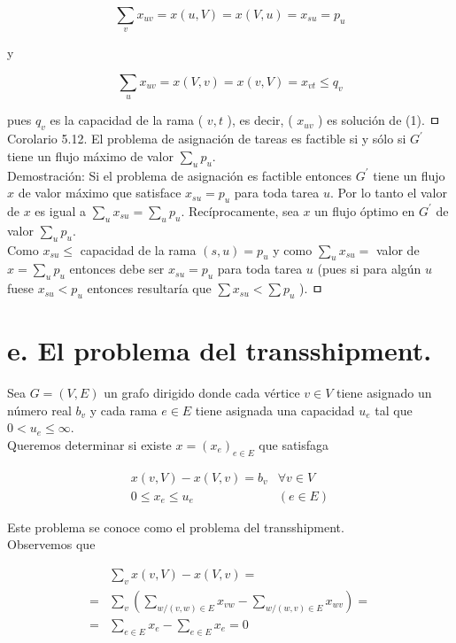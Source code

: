 \documentclass[10pt]{article}
\begin{document}
$$
\sum_{v} x_{u v}=x(u, V)=x(V, u)=x_{s u}=p_{u}
$$

y

$$
\sum_{u} x_{u v}=x(V, v)=x(v, V)=x_{v t} \leq q_{v}
$$

pues $q_{v}$ es la capacidad de la rama ( $v, t$ ), es decir, ( $x_{u v}$ ) es solución de (1). ㅁ\\
Corolario 5.12. El problema de asignación de tareas es factible si y sólo si $G^{\prime}$ tiene un flujo máximo de valor $\sum_{u} p_{u}$.\\
Demostración: Si el problema de asignación es factible entonces $G^{\prime}$ tiene un flujo $x$ de valor máximo que satisface $x_{s u}=p_{u}$ para toda tarea $u$. Por lo tanto el valor de $x$ es igual a $\sum_{u} x_{s u}=\sum_{u} p_{u}$. Recíprocamente, sea $x$ un flujo óptimo en $G^{\prime}$ de valor $\sum_{u} p_{u}$.\\
Como $x_{s u} \leq$ capacidad de la rama $(s, u)=p_{u}$ y como $\sum_{u} x_{s u}=$ valor de $x=\sum_{u} p_{u}$ entonces debe ser $x_{s u}=p_{u}$ para toda tarea $u$ (pues si para algún $u$ fuese $x_{s u}<p_{u}$ entonces resultaría que $\sum x_{s u}<\sum p_{u}$ ). ㅁ

\section*{e. El problema del transshipment.}
Sea $G=(V, E)$ un grafo dirigido donde cada vértice $v \in V$ tiene asignado un número real $b_{v}$ y cada rama $e \in E$ tiene asignada una capacidad $u_{e}$ tal que $0<u_{e} \leq \infty$.\\
Queremos determinar si existe $x=\left(x_{e}\right)_{e \in E}$ que satisfaga

$$
\begin{aligned}
x(v, V)-x(V, v)=b_{v} & \forall v \in V \\
0 \leq x_{e} \leq u_{e} & (e \in E)
\end{aligned}
$$

Este problema se conoce como el problema del transshipment.\\
Observemos que

$$
\begin{aligned}
& \sum_{v} x(v, V)-x(V, v)= \\
= & \sum_{v}\left(\sum_{w /(v, w) \in E} x_{v w}-\sum_{w /(w, v) \in E} x_{w v}\right)= \\
= & \sum_{e \in E} x_{e}-\sum_{e \in E} x_{e}=0
\end{aligned}
$$
\end{document}
